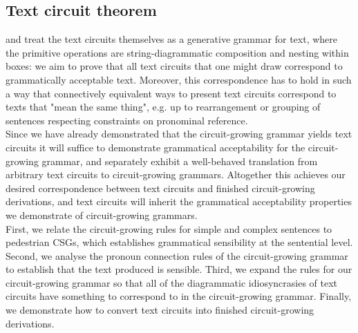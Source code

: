 \vfill

\newpage
\clearpage

\newpage

\subsection{Text circuit theorem}

 and treat the text circuits themselves as a generative grammar for text, where the primitive operations are string-diagrammatic composition and nesting within boxes: we aim to prove that all text circuits that one might draw correspond to grammatically acceptable text. Moreover, this correspondence has to hold in such a way that connectively equivalent ways to present text circuits correspond to texts that "mean the same thing", e.g. up to rearrangement or grouping of sentences respecting constraints on pronominal reference.\\

 Since we have already demonstrated that the circuit-growing grammar yields text circuits it will suffice to demonstrate grammatical acceptability for the circuit-growing grammar, and separately exhibit a well-behaved translation from arbitrary text circuits to circuit-growing grammars. Altogether this achieves our desired correspondence between text circuits and finished circuit-growing derivations, and text circuits will inherit the grammatical acceptability properties we demonstrate of circuit-growing grammars.\\

 First, we relate the circuit-growing rules for simple and complex sentences to pedestrian CSGs, which establishes grammatical sensibility at the sentential level. Second, we analyse the pronoun connection rules of the circuit-growing grammar to establish that the text produced is sensible. Third, we expand the rules for our circuit-growing grammar so that all of the diagrammatic idiosyncrasies of text circuits have something to correspond to in the circuit-growing grammar. Finally, we demonstrate how to convert text circuits into finished circuit-growing derivations.
\clearpage

